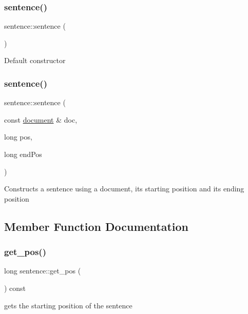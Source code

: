 \subsubsection{\texorpdfstring{sentence()}{sentence()}\hspace{0.1cm}{\footnotesize\ttfamily [1/2]}}
{\footnotesize\ttfamily sentence\+::sentence (\begin{DoxyParamCaption}{ }\end{DoxyParamCaption})}

Default constructor \mbox{\label{classsentence_ade30f24b62f56cf53fd38d0fb541082c}} 
\subsubsection{\texorpdfstring{sentence()}{sentence()}\hspace{0.1cm}{\footnotesize\ttfamily [2/2]}}
{\footnotesize\ttfamily sentence\+::sentence (\begin{DoxyParamCaption}\item[{const \hyperlink{classdocument}{document} \&}]{doc,  }\item[{long}]{pos,  }\item[{long}]{end\+Pos }\end{DoxyParamCaption})}

Constructs a sentence using a document, its starting position and its ending position 

\subsection{Member Function Documentation}
\mbox{\label{classsentence_a033a9fd50b254e87d5303a23b2f02295}} 
\subsubsection{\texorpdfstring{get\+\_\+pos()}{get\_pos()}}
{\footnotesize\ttfamily long sentence\+::get\+\_\+pos (\begin{DoxyParamCaption}{ }\end{DoxyParamCaption}) const}

gets the starting position of the sentence \mbox{\label{classsentence_ad673d4210850083f621383e2629a7b0e}} 
